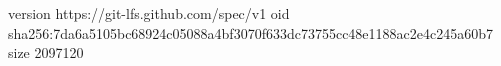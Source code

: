 version https://git-lfs.github.com/spec/v1
oid sha256:7da6a5105bc68924c05088a4bf3070f633dc73755cc48e1188ac2e4c245a60b7
size 2097120
